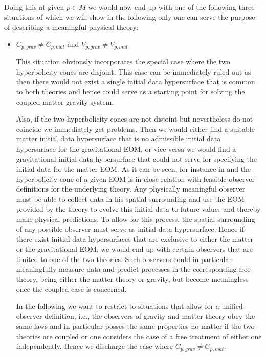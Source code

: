 Doing this at given $p \in M$ we would now end up with one of the following three situations of which we will show in the following only one can serve the purpose of describing a meaningful physical theory:
\begin{itemize}
    \item $C_{p,grav} \neq C_{p,mat}$ and $V_{p,grav} \neq V_{p,mat}$
    
This situation obviously incorporates the special case where the two hyperbolicity cones are disjoint. This case can be immediately ruled out as then there would not exist a single initial data hypersurface that is common to both theories and hence could serve as a starting point for solving the coupled matter gravity system.   

Also, if the two hyperbolicity cones are not disjoint but nevertheless do not coincide we immediately get problems. Then we would either find a suitable matter initial data hypersurface that is no admissible initial data hypersurface for the gravitational EOM, or vice versa we would find a gravitational initial data hypersurface that could not serve for specifying the initial data for the matter EOM. As it can be seen, for instance in \cite{Rivera} and \cite{2011PhRvD..83d4047R} the hyperbolicity cone of a given EOM is in close relation with feasible observer definitions for the underlying theory. Any physically meaningful observer must be able to collect data in his spatial surrounding and use the EOM provided by the theory to evolve this initial data to future values and thereby make physical predictions. To allow for this process, the spatial surrounding of any possible observer must serve as initial data hypersurface. Hence if there exist initial data hypersurfaces that are exclusive to either the matter or the gravitational EOM, we would end up with certain observers that are limited to one of the two theories. Such observers could in particular meaningfully measure data and predict processes in the corresponding free theory, being either the matter theory or gravity, but become meaningless once the coupled case is concerned.

In the following we want to restrict to situations that allow for a unified observer definition, i.e., the observers of gravity and matter theory obey the same laws and in particular posses the same properties no matter if the two theories are coupled or one considers the case of a free treatment of either one independently. Hence we discharge the case where $C_{p,grav} \neq C_{p,mat}$.


\end{itemize}
